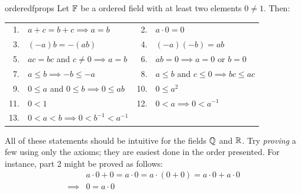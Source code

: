 \begin{thm}{}{orderedfprops}
	Let $\mathbb{F}$ be a ordered field with at least two elements $0\neq 1$. Then:\smallbreak
	\def\arraystretch{1.4}
	\begin{tabular}{rl@{\qquad}rl}
	  1.&$a+c=b+c\implies a=b$ &2.&$a\cdot 0=0$\\
	  3.&$(-a)b=-(ab)$&4.&$(-a)(-b)=ab$\\
	  5.&$ac=bc$ and $c\neq 0\implies a=b$ &6.&$ab=0\implies a=0$ or $b=0$\\
	  7.&$a\le b\implies -b\le -a$&8.&$a\le b$ and $c\le 0\implies bc\le ac$\\
	  9.&$0\le a$ and $0\le b\implies 0\le ab$&10.&$0\le a^2$\\
	  11.&$0<1$&12.&$0<a\implies 0<a^{-1}$\\
	  13.&$0<a<b\implies 0<b^{-1}<a^{-1}$&&
	\end{tabular}
\end{thm}

All of these statements should be intuitive for the fields $\mathbb{Q}$ and $\mathbb{R}$. Try \emph{proving} a few using only the axioms; they are easiest done in the order presented. For instance, part 2 might be proved as follows:
\begin{align*}
&a\cdot 0+0=a\cdot 0=a\cdot(0+0)=a\cdot 0+a\cdot 0 \tag{additive identity/distibutive axioms}\\
\implies &0=a\cdot 0 \tag{part 1}
\end{align*}


